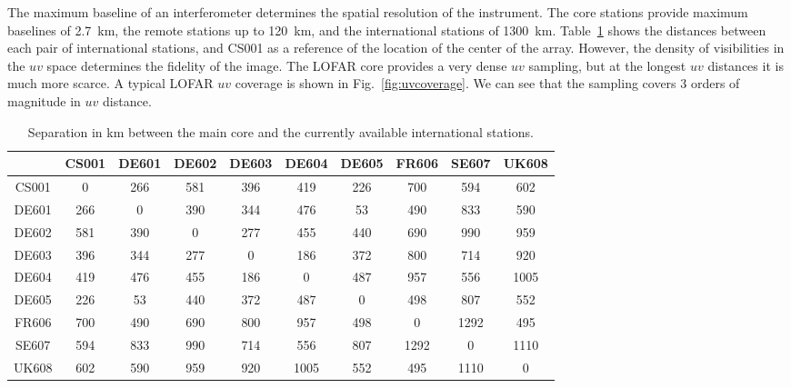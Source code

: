 \documentclass[graybox]{svmult}
\begin{document}
The maximum baseline of an interferometer determines the spatial resolution of
the instrument. The core stations provide maximum baselines of 2.7~km, the
remote stations up to 120~km, and the international stations of 1300~km.
Table~\ref{tab:baselines} shows the distances between each pair of international
stations, and CS001 as a reference of the location of the center of the array.
However, the density of visibilities in the $uv$ space determines the fidelity
of the image. The LOFAR core provides a very dense $uv$ sampling, but at the
longest $uv$ distances it is much more scarce. A typical LOFAR $uv$ coverage is
shown in Fig.~\ref{fig:uvcoverage}. We can see that the sampling covers 3 orders
of magnitude in $uv$ distance.


\begin{table}[h]
\centering
\begin{tabular}{cccccccccc}
\hline
\hline
      & CS001& DE601& DE602& DE603& DE604& DE605& FR606& SE607& UK608\\
\hline
 CS001&     0&   266&   581&   396&   419&   226&   700&   594&   602 \\
 DE601&   266&     0&   390&   344&   476&    53&   490&   833&   590 \\
 DE602&   581&   390&     0&   277&   455&   440&   690&   990&   959 \\
 DE603&   396&   344&   277&     0&   186&   372&   800&   714&   920 \\
 DE604&   419&   476&   455&   186&     0&   487&   957&   556&  1005 \\
 DE605&   226&    53&   440&   372&   487&     0&   498&   807&   552 \\
 FR606&   700&   490&   690&   800&   957&   498&     0&  1292&   495 \\
 SE607&   594&   833&   990&   714&   556&   807&  1292&     0&  1110 \\
 UK608&   602&   590&   959&   920&  1005&   552&   495&  1110&     0 \\
\hline
\end{tabular}
\caption{Separation in km between the main core and the currently available
international stations.
\label{tab:baselines}}
\end{table}
\end{document}
